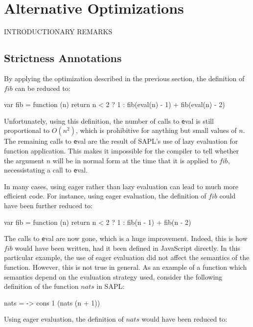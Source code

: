 \section{Alternative Optimizations}\label{sapljs:sec:optimizations}
INTRODUCTIONARY REMARKS

\subsection{Strictness Annotations}
By applying the optimization described in the previous section, the definition
of $fib$ can be reduced to:

\begin{CleanCode}
var fib = function (n) {
    return n < 2 ? 1 : fib(eval(n) - 1) + fib(eval(n) - 2)
}
\end{CleanCode}

Unfortunately, using this definition, the number of calls to {\texttt eval} is
still proportional to $O(n^2)$, which is prohibitive for anything but small
values of $n$. The remaining calls to {\texttt eval} are the result of SAPL's
use of lazy evaluation for function application. This makes it impossible for
the compiler to tell whether the argument $n$ will be in normal form at the time
that it is applied to $fib$, necessistating a call to {\texttt eval}.

In many cases, using eager rather than lazy evaluation can lead to much more
efficient code. For instance, using eager evaluation, the definition of $fib$
could have been further reduced to:

\begin{CleanCode}
var fib = function (n) {
    return n < 2 ? 1 : fib(n - 1) + fib(n - 2)
}
\end{CleanCode}

The calls to {\texttt eval} are now gone, which is a huge improvement. Indeed,
this is how $fib$ would have been written, had it been defined in JavaScript
directly. In this particular example, the use of eager evaluation did not affect
the semantics of the function. However, this is not true in general. As an
example of a function which semantics depend on the evaluation strategy used,
consider the following definition of the function $nats$ in SAPL:

\begin{CleanCode}
nats = \n -> cons 1 (nats (n + 1))
\end{CleanCode}

Using eager evaluation, the definition of $nats$ would have been reduced to:

